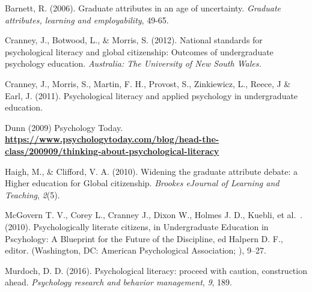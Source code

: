 \documentclass[
  11pt,
  letterpaper,
  oneside,
  open=any]{scrbook}
\begin{document}
\begin{itemize}
\begin{tcolorbox}
\begin{itemize}
    Barnett, R. (2006). Graduate attributes in an age of uncertainty.
    \emph{Graduate attributes, learning and employability}, 49-65.

    Cranney, J., Botwood, L., \& Morris, S. (2012). National standards
    for psychological literacy and global citizenship: Outcomes of
    undergraduate psychology education. \emph{Australia: The University
    of New South Wales.}

    Cranney, J., Morris, S., Martin, F. H., Provost, S., Zinkiewicz, L.,
    Reece, J \& Earl, J. (2011). Psychological literacy and applied
    psychology in undergraduate education.

    Dunn (2009) Psychology Today.
    \href{https://www.psychologytoday.com/blog/head-the-class/200909/thinking-about-psychological-literacy}{\textbf{https://www.psychologytoday.com/blog/head-the-class/200909/thinking-about-psychological-literacy}}

    Haigh, M., \& Clifford, V. A. (2010). Widening the graduate
    attribute debate: a Higher education for Global citizenship.
    \emph{Brookes eJournal of Learning and Teaching}, \emph{2}(5).

    McGovern T. V., Corey L., Cranney J., Dixon W., Holmes J. D.,
    Kuebli, et al.~. (2010). Psychologically literate citizens, in
    Undergraduate Education in Pscyhology: A Blueprint for the Future of
    the Discipline, ed Halpern D. F., editor. (Washington, DC: American
    Psychological Association; ), 9--27.

    Murdoch, D. D. (2016). Psychological literacy: proceed with caution,
    construction ahead. \emph{Psychology research and behavior
    management}, \emph{9}, 189.


\end{itemize}
\end{tcolorbox}
\end{itemize}
\end{document}
